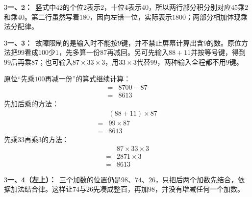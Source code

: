 \documentclass[multi=snippet,border={5bp 20bp 5bp 5bp}]{standalone}
\newenvironment{snippet}[3]{\begin{minipage}{#1bp}\color{answerred}\fontsize{#2}{#3}\selectfont\raggedright}{\end{minipage}}
\begin{document}
\begin{snippet}{505}{11.5}{14}\begin{multicols}{3}\raggedcolumns \textbf{一、2：}\ 竖式中\(42\)\allowbreak 的个位\(2\)\allowbreak 表示\(2\)\allowbreak ，十位\(4\)\allowbreak 表示\(40\)\allowbreak ，所以两行部分积分别对应\(45\)\allowbreak 乘\(2\)\allowbreak 和乘\(40\)\allowbreak 。第二行虽然写着\(180\)\allowbreak ，因向左错一位，实际表示\(1800\)\allowbreak ；两部分相加体现乘法分配律。\end{multicols}\end{snippet}
\begin{snippet}{505}{11.5}{14}\begin{multicols}{3}\raggedcolumns \textbf{一、3：}\ 故障限制的是输入时不能按\(9\)\allowbreak 键，并不禁止屏幕计算出含\(9\)\allowbreak 的数。原位方法把\(99\)\allowbreak 看成\(100\)\allowbreak 少\(1\)\allowbreak ，先多算一份\(87\)\allowbreak 再减回。另可先输入\(88+11\)\allowbreak 并按等号键，得到\(99\)\allowbreak 后再乘\(87\)\allowbreak ；也可输入\(87\times33\times3\)\allowbreak ，用\(33\times3\)\allowbreak 代替\(99\)\allowbreak ，两种输入全程都不用\(9\)\allowbreak 键。\par 原位“先乘\(100\)\allowbreak 再减一份”的算式继续计算：\[\begin{aligned}={}&8700-87\\={}&8613\end{aligned}\]先加后乘的方法：\[\begin{aligned}&(88+11)\times87\\={}&99\times87\\={}&8613\end{aligned}\]先乘\(33\)\allowbreak 再乘\(3\)\allowbreak 的方法：\[\begin{aligned}&87\times33\times3\\={}&2871\times3\\={}&8613\end{aligned}\]\end{multicols}\end{snippet}
\begin{snippet}{505}{11.5}{14}\begin{multicols}{3}\raggedcolumns \textbf{一、4（左上）：}\ 三个加数的位置仍是\(98\)\allowbreak 、\(74\)\allowbreak 、\(26\)\allowbreak ，只把后两个加数先结合，依据加法结合律。这样让\(74\)\allowbreak 与\(26\)\allowbreak 先凑成整百，再加\(98\)\allowbreak ，并没有增减任何一个加数。\end{multicols}\end{snippet}
\end{document}
